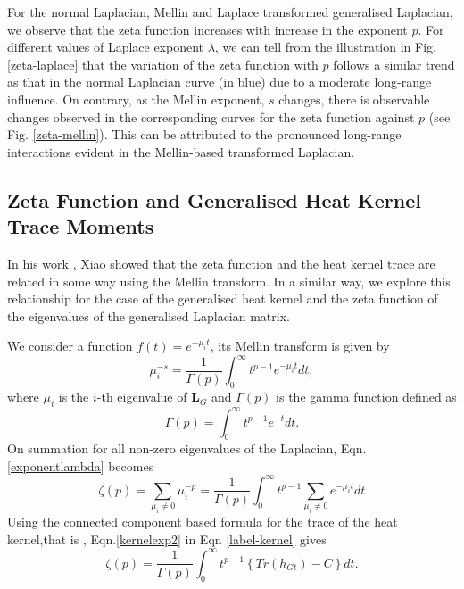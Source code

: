 \documentclass[10pt,a4paper]{article}
\begin{document}
    For the normal Laplacian, Mellin and Laplace transformed generalised Laplacian, we observe that the zeta function increases with increase in the exponent $p$. For different values of Laplace exponent $\lambda$, we can tell from the illustration in Fig.\ref{zeta-laplace} that the variation of the zeta function with $p$ follows a similar trend as that in the normal Laplacian curve (in blue) due to a moderate long-range influence. On contrary, as the Mellin exponent, $s$ changes, there is observable changes observed in the corresponding curves for the zeta function against $p$ (see Fig. \ref{zeta-mellin}). This can be attributed to the pronounced long-range interactions evident in the Mellin-based transformed Laplacian.
    
    \subsection{Zeta Function and Generalised Heat Kernel Trace Moments}
     In his work \citep{xiao2009graph}, Xiao showed that the zeta function and the heat kernel trace are related in some way using the Mellin transform. In a similar way, we explore this relationship for the case of the generalised heat kernel and the zeta function of the eigenvalues of the generalised Laplacian matrix.
    
    We consider a function $f(t)=e^{-\mu_i t}$, its Mellin transform is given by
    \begin{equation}
    \mu_i ^{-s} = \frac{1}{\Gamma(p)} \int_{0}^{\infty} t^{p-1} e^{-\mu_i t} dt,
    \label{exponentlambda}
    \end{equation}
    where $\mu_i$ is the $i$-th eigenvalue of $\mathbf{L}_G$ and $\Gamma(p)$ is the gamma function defined as 
    \begin{equation}
    \Gamma(p) = \int_{0}^{\infty} t^{p-1} e^{-t} dt.
    \end{equation}
    On summation for all non-zero eigenvalues of the Laplacian, Eqn.\ref{exponentlambda} becomes
    \begin{equation}
    \zeta(p) = \sum_{\mu_i \neq 0} \mu_i ^{-p} = \frac{1}{\Gamma(p)} \int_{0}^{\infty} t^{p-1} \sum_{\mu_i \neq 0} e^{-\mu_i t} dt
    \label{label-kernel}
    \end{equation}
    Using the connected component based formula for the trace of the heat kernel,that is , Eqn.\ref{kernelexp2} in Eqn \ref{label-kernel} gives
    \begin{equation}
    \zeta(p) = \frac{1}{\Gamma(p)} \int_{0}^{\infty} t^{p-1} \left \{ Tr(h_{Gt})-C \right \} dt.
    \end{equation}
    
\end{document}

